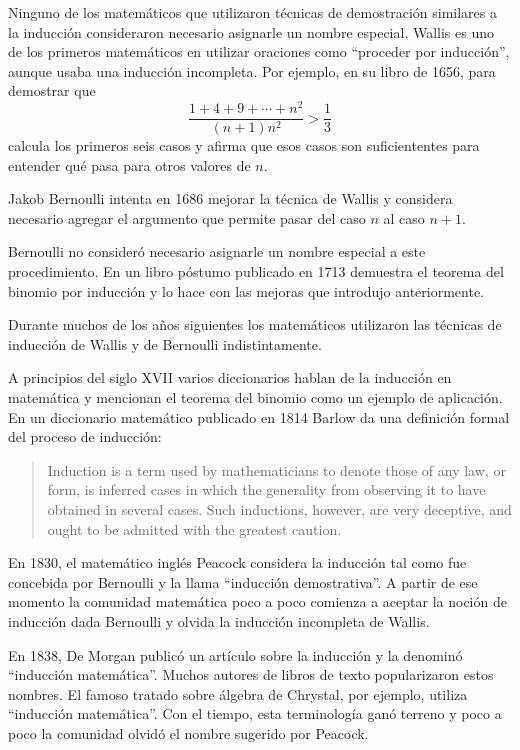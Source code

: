 Ninguno de los matemáticos
que utilizaron técnicas de demostración similares a la inducción consideraron
necesario asignarle un nombre especial. Wallis es uno de los primeros
matemáticos en utilizar oraciones como ``proceder por inducción'', aunque usaba
una inducción incompleta. Por ejemplo, en su libro de 1656, para demostrar que
\[
	\frac{1+4+9+\cdots+n^2}{(n+1)n^2}>\frac13
\]
calcula los primeros seis casos y afirma que esos casos son suficiententes para
entender qué pasa para otros valores de $n$. 

Jakob Bernoulli intenta en 1686
mejorar la técnica de Wallis y considera necesario agregar el argumento que
permite pasar del caso $n$ al caso $n+1$. 

Bernoulli no consideró necesario
asignarle un nombre especial a este procedimiento. En un libro póstumo
publicado en 1713 demuestra el teorema del binomio por inducción y lo hace con
las mejoras que introdujo anteriormente. 

Durante muchos de los años siguientes
los matemáticos utilizaron las técnicas de inducción de Wallis y de Bernoulli
indistintamente. 

A principios del siglo XVII varios diccionarios hablan de la
inducción en matemática y mencionan el teorema del binomio como un ejemplo de
aplicación.  En un diccionario matemático publicado en 1814 Barlow da una
definición formal del proceso de inducción:
\begin{quote}
	Induction is a term used by mathematicians to denote those of any law, or
	form, is inferred cases in which the generality from observing it to have
	obtained in several cases. Such inductions, however, are very deceptive,
	and ought to be admitted with the greatest caution.
\end{quote}
En 1830, el matemático inglés Peacock considera la inducción tal como fue
concebida por Bernoulli y la llama ``inducción demostrativa''. A partir de ese
momento la comunidad matemática poco a poco comienza a aceptar la noción de
inducción dada Bernoulli y olvida la inducción incompleta de Wallis.  

En 1838,
De Morgan publicó un artículo sobre la inducción y la denominó ``inducción
matemática''. Muchos autores de libros de texto popularizaron estos nombres.
El famoso tratado sobre álgebra de Chrystal, por ejemplo, utiliza ``inducción
matemática''. Con el tiempo, esta terminología ganó terreno y poco a poco la
comunidad olvidó el nombre sugerido por Peacock. 


